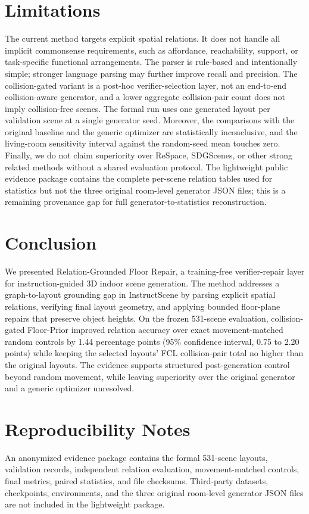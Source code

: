 \documentclass{article}
\newcommand{\method}{Relation-Grounded Floor Repair}
\newcommand{\fp}{Floor-Prior}
\begin{document}
\section{Limitations}

The current method targets explicit spatial relations. It does not handle all implicit commonsense requirements, such as affordance, reachability, support, or task-specific functional arrangements. The parser is rule-based and intentionally simple; stronger language parsing may further improve recall and precision. The collision-gated variant is a post-hoc verifier-selection layer, not an end-to-end collision-aware generator, and a lower aggregate collision-pair count does not imply collision-free scenes. The formal run uses one generated layout per validation scene at a single generator seed. Moreover, the comparisons with the original baseline and the generic optimizer are statistically inconclusive, and the living-room sensitivity interval against the random-seed mean touches zero. Finally, we do not claim superiority over ReSpace, SDGScenes, or other strong related methods without a shared evaluation protocol. The lightweight public evidence package contains the complete per-scene relation tables used for statistics but not the three original room-level generator JSON files; this is a remaining provenance gap for full generator-to-statistics reconstruction.

\section{Conclusion}

We presented \method, a training-free verifier-repair layer for instruction-guided 3D indoor scene generation. The method addresses a graph-to-layout grounding gap in InstructScene by parsing explicit spatial relations, verifying final layout geometry, and applying bounded floor-plane repairs that preserve object heights. On the frozen 531-scene evaluation, collision-gated \fp{} improved relation accuracy over exact movement-matched random controls by 1.44 percentage points (95\% confidence interval, 0.75 to 2.20 points) while keeping the selected layouts' FCL collision-pair total no higher than the original layouts. The evidence supports structured post-generation control beyond random movement, while leaving superiority over the original generator and a generic optimizer unresolved.

\section*{Reproducibility Notes}

An anonymized evidence package contains the formal 531-scene layouts, validation records, independent relation evaluation, movement-matched controls, final metrics, paired statistics, and file checksums. Third-party datasets, checkpoints, environments, and the three original room-level generator JSON files are not included in the lightweight package.



\end{document}
